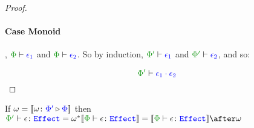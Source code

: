 \documentclass{report}
\begin{document}
\begin{framed}
\begin{proof}
        
            \paragraph{Case Monoid}
        
            \bi, $\wellformed{\P}{\e_1}$ and $\wellformed{\P}{\e_2}$. So by induction,
            $\wellformed{\P'}{\e_1}$ and $\wellformed{\P'}{\e_2}$, and so:
        
            \begin{equation}
                \wellformed{\P'}{\e_1\dot\e_2}
            \end{equation}
        \end{proof}
    
\end{framed}

\begin{theorem}
    If $\omega = {\bf [\![}\omega \colon {\color{blue}\Phi'} \triangleright {\color {blue} \Phi}{\bf ]\!]}$ then $\typerelation{\P'}{\e}{\effect} = \w\star\deno{\typerelation{\P}{\e}{\effect}} = \deno{\typerelation{\P}{\e}{\effect}}\after\w$
    
\end{theorem}
\end{document}
